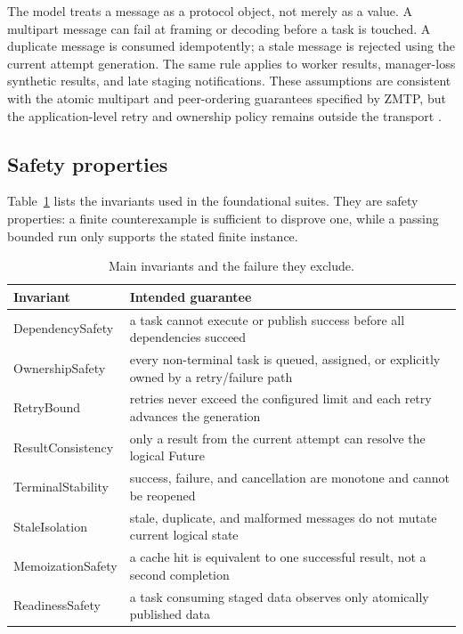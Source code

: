 \documentclass[11pt,a4paper]{article}
\newenvironment{tabularx}[2]{\begin{tabular}{#2}}{\end{tabular}}
\begin{document}
The model treats a message as a protocol object, not merely as a value. A multipart message can
fail at framing or decoding before a task is touched. A duplicate message is consumed idempotently;
a stale message is rejected using the current attempt generation. The same rule applies to worker
results, manager-loss synthetic results, and late staging notifications. These assumptions are
consistent with the atomic multipart and peer-ordering guarantees specified by ZMTP, but the
application-level retry and ownership policy remains outside the transport
\cite{zmtp37,zeromqguide,birman1987reliable}.

\subsection{Safety properties}
Table~\ref{tab:invariants} lists the invariants used in the foundational suites. They are safety
properties: a finite counterexample is sufficient to disprove one, while a passing bounded run only
supports the stated finite instance.

\begin{table}[h]
\centering
\caption{Main invariants and the failure they exclude.}
\label{tab:invariants}
\normalsize
\begin{tabularx}{\textwidth}{>{\raggedright\arraybackslash}p{0.25\textwidth} X}
\toprule
Invariant & Intended guarantee \\
\midrule
DependencySafety & a task cannot execute or publish success before all dependencies succeed \\
OwnershipSafety & every non-terminal task is queued, assigned, or explicitly owned by a retry/failure path \\
RetryBound & retries never exceed the configured limit and each retry advances the generation \\
ResultConsistency & only a result from the current attempt can resolve the logical Future \\
TerminalStability & success, failure, and cancellation are monotone and cannot be reopened \\
StaleIsolation & stale, duplicate, and malformed messages do not mutate current logical state \\
MemoizationSafety & a cache hit is equivalent to one successful result, not a second completion \\
ReadinessSafety & a task consuming staged data observes only atomically published data \\
\bottomrule
\end{tabularx}
\end{table}
\end{document}
